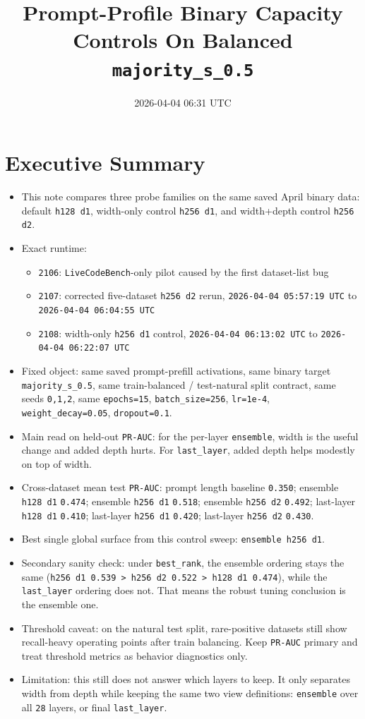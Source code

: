 \documentclass[11pt]{article}
\title{Prompt-Profile Binary Capacity Controls On Balanced \texttt{majority\_s\_0.5}}
\author{}
\date{2026-04-04 06:31 UTC}
\begin{document}
\maketitle

\section*{Executive Summary}
\begin{itemize}[leftmargin=1.5em]
\item This note compares three probe families on the same saved April binary data: default \texttt{h128 d1}, width-only control \texttt{h256 d1}, and width+depth control \texttt{h256 d2}.
\item Exact runtime:
  \begin{itemize}[leftmargin=1.5em]
  \item \texttt{2106}: \texttt{LiveCodeBench}-only pilot caused by the first dataset-list bug
  \item \texttt{2107}: corrected five-dataset \texttt{h256 d2} rerun, \texttt{2026-04-04 05:57:19 UTC} to \texttt{2026-04-04 06:04:55 UTC}
  \item \texttt{2108}: width-only \texttt{h256 d1} control, \texttt{2026-04-04 06:13:02 UTC} to \texttt{2026-04-04 06:22:07 UTC}
  \end{itemize}
\item Fixed object: same saved prompt-prefill activations, same binary target \texttt{majority\_s\_0.5}, same train-balanced / test-natural split contract, same seeds \texttt{0,1,2}, same \texttt{epochs=15}, \texttt{batch\_size=256}, \texttt{lr=1e-4}, \texttt{weight\_decay=0.05}, \texttt{dropout=0.1}.
\item Main read on held-out \texttt{PR-AUC}: for the per-layer \texttt{ensemble}, width is the useful change and added depth hurts. For \texttt{last\_layer}, added depth helps modestly on top of width.
\item Cross-dataset mean test \texttt{PR-AUC}: prompt length baseline \texttt{0.350}; ensemble \texttt{h128 d1} \texttt{0.474}; ensemble \texttt{h256 d1} \texttt{0.518}; ensemble \texttt{h256 d2} \texttt{0.492}; last-layer \texttt{h128 d1} \texttt{0.410}; last-layer \texttt{h256 d1} \texttt{0.420}; last-layer \texttt{h256 d2} \texttt{0.430}.
\item Best single global surface from this control sweep: \texttt{ensemble h256 d1}.
\item Secondary sanity check: under \texttt{best\_rank}, the ensemble ordering stays the same (\texttt{h256 d1 0.539 > h256 d2 0.522 > h128 d1 0.474}), while the \texttt{last\_layer} ordering does not. That means the robust tuning conclusion is the ensemble one.
\item Threshold caveat: on the natural test split, rare-positive datasets still show recall-heavy operating points after train balancing. Keep \texttt{PR-AUC} primary and treat threshold metrics as behavior diagnostics only.
\item Limitation: this still does not answer which layers to keep. It only separates width from depth while keeping the same two view definitions: \texttt{ensemble} over all \texttt{28} layers, or final \texttt{last\_layer}.
\end{itemize}
\end{document}
